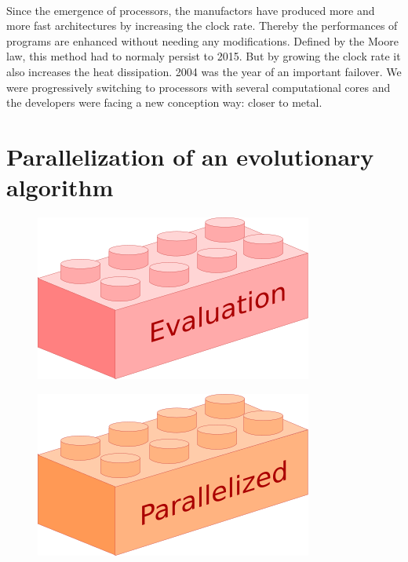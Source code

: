 
\paragraph{}

Since the emergence of processors, the manufactors have produced more and more fast architectures by increasing the clock rate. Thereby the performances of programs are enhanced without needing any modifications. Defined by the Moore law, this method had to normaly persist to 2015. But by growing the clock rate it also increases the heat dissipation. 2004 was the year of an important failover. We were progressively switching to processors with several computational cores and the developers were facing a new conception way: closer to metal.

\section{Parallelization of an evolutionary algorithm}

\begin{figure}[H]
  \centering
  \includegraphics[scale=0.5]{images/evaluation_box}
\end{figure}

\begin{figure}[H]
  \centering
  \includegraphics[scale=0.5]{images/parallelized_box}
\end{figure}

